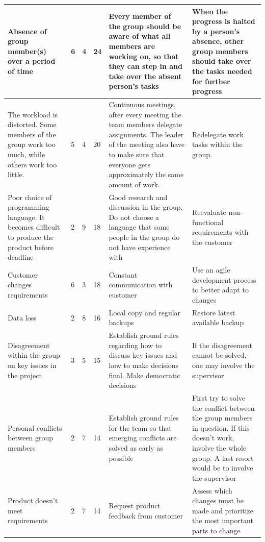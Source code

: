 \begin{appendices}
\begin{longtable}{ | p{4.5cm} | p{1cm} | p{1cm} | p{1cm} | p{4.5cm} | p{4.5cm} |}
	Absence of group member(s) over a period of time & 6 & 4 & 24 & Every member of the group should be aware of what all members are working on, so that they can step in and take over the absent person's tasks & When the progress is halted by a person's absence, other group members should take over the tasks needed for further progress \\ \hline
	
	The workload is distorted. Some members of the group work too much, while others work too little. & 5 & 4 & 20 & Continuous meetings, after every meeting the team members delegate assignments. The leader of the meeting also have to make sure that everyone gets approximately the same amount of work. & Redelegate work tasks within the group. \\ \hline
	
	Poor choice of programming language. It becomes difficult to produce the product before deadline & 2 & 9 & 18 & Good research and discussion in the group. Do not choose a language that some people in the group do not have experience with & Reevaluate non-functional requirements with the customer \\ \hline
	
	Customer changes requirements & 6 & 3 & 18 & Constant communication with customer & Use an agile development process to better adapt to changes \\ \hline
	
	Data loss & 2 & 8 & 16 & Local copy and regular backups & Restore latest available backup \\ \hline
	
	Disagreement within the group on key issues in the project & 3 & 5 & 15 & Establish ground rules regarding how to discuss key issues and how to make decisions final. Make democratic decisions & If the disagreement cannot be solved, one may involve the supervisor \\ \hline
	
	Personal conflicts between group members & 2 & 7 & 14 & Establish ground rules for the team so that emerging conflicts are solved as early as possible & First try to solve the conflict between the group members in question. If this doesn't work, involve the whole group. A last resort would be to involve the supervisor \\ \hline
	
	Product doesn't meet requirements & 2 & 7 & 14 & Request product feedback from customer & Assess which changes must be made and prioritize the most important parts to change \\ \hline
	

\end{longtable}
\end{appendices}
